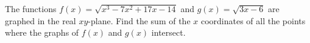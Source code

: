 The functions $f(x)=\sqrt{x^3-7x^2+17x-14}$ and $g(x)=\sqrt{3x-6}$ are graphed in the real $xy$-plane. Find the sum of the $x$ coordinates of all the points where the graphs of $f(x)$ and $g(x)$ intersect.
